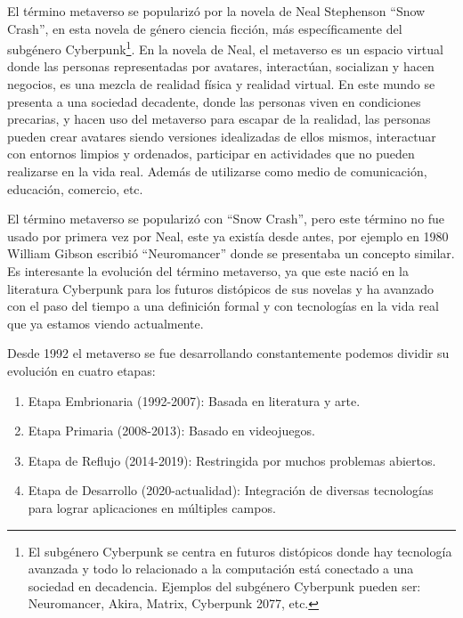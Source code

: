 \documentclass[a4paper,10pt]{article}
\begin{document}
	El término metaverso se popularizó por la novela de Neal Stephenson “Snow Crash”, en esta novela de género ciencia ficción, más específicamente del subgénero Cyberpunk\footnote{El subgénero Cyberpunk se centra en futuros distópicos donde hay tecnología avanzada y todo lo relacionado a la computación está conectado a una sociedad en decadencia. Ejemplos del subgénero Cyberpunk pueden ser: Neuromancer, Akira, Matrix, Cyberpunk 2077, etc.}. En la novela de Neal, el metaverso es un espacio virtual donde las personas representadas por avatares, interactúan, socializan y hacen negocios, es una mezcla de realidad física y realidad virtual. En este mundo se presenta a una sociedad decadente, donde las personas viven en condiciones precarias, y hacen uso del metaverso para escapar de la realidad, las personas pueden crear avatares siendo versiones idealizadas de ellos mismos, interactuar con entornos limpios y ordenados, participar en actividades que no pueden realizarse en la vida real. Además de utilizarse como medio de comunicación, educación, comercio, etc.
	
	El término metaverso se popularizó con “Snow Crash”, pero este término no fue usado por primera vez por Neal, este ya existía desde antes, por ejemplo en 1980 William Gibson escribió “Neuromancer” donde se presentaba un concepto similar. Es interesante la evolución del término metaverso, ya que este nació en la literatura Cyberpunk para los futuros distópicos de sus novelas y ha avanzado con el paso del tiempo a una definición formal y con tecnologías en la vida real que ya estamos viendo actualmente.
	
	Desde 1992 el metaverso se fue desarrollando constantemente podemos dividir su evolución en cuatro etapas:
	\begin{enumerate}
		\item Etapa Embrionaria (1992-2007): Basada en literatura y arte.
		\item Etapa Primaria (2008-2013): Basado en videojuegos.
		\item Etapa de Reflujo (2014-2019): Restringida por muchos problemas abiertos.
		\item Etapa de Desarrollo (2020-actualidad): Integración de diversas tecnologías para lograr aplicaciones en múltiples campos.
	\end{enumerate}
	
\end{document}

